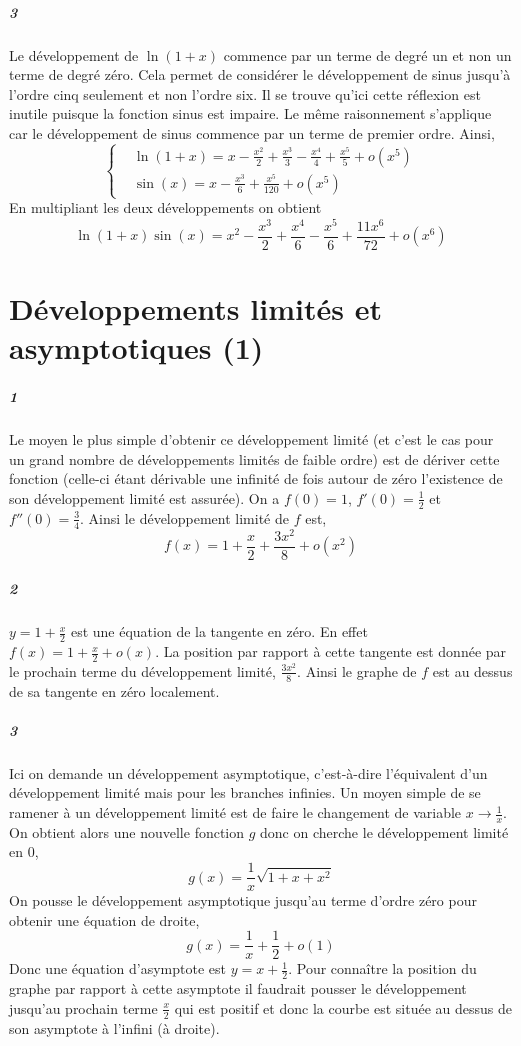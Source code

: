 \documentclass[10pt,a4paper]{article}
\newcommand{\al}[1]{\begin{aligned} #1 \end{aligned}}
\begin{document}
\subparagraph{3}
Le développement de $\ln(1+x)$ commence par un terme de degré un et non un terme de degré zéro. Cela permet de considérer le développement de sinus jusqu'à l'ordre cinq seulement et non l'ordre six. Il se trouve qu'ici cette réflexion est inutile puisque la fonction sinus est impaire. Le même raisonnement s'applique car le développement de sinus commence par un terme de premier ordre.
Ainsi,
\[
\left\lbrace
\al{
&\ln(1+x) = x - \frac{x^2}{2} + \frac{x^3}{3} - \frac{x^4}{4} + \frac{x^5}{5} + o(x^5) \\
&\sin(x) = x - \frac{x^3}{6} + \frac{x^5}{120} + o(x^5)
}
\right.
\]
En multipliant les deux développements on obtient
\[
\ln(1+x)\sin(x) = x^2 - \frac{x^3}{2} + \frac{x^4}{6} - \frac{x^5}{6} + \frac{11x^6}{72} + o(x^6)
\]
\section{Développements limités et asymptotiques (1)}

\subparagraph{1}Le moyen le plus simple d'obtenir ce développement limité (et c'est le cas pour un grand nombre de développements limités de faible ordre) est de dériver cette fonction (celle-ci étant dérivable une infinité de fois autour de zéro l'existence de son développement limité est assurée). On a $f(0) = 1$, $f'(0) = \frac{1}{2}$ et $f''(0) = \frac{3}{4}$. Ainsi le développement limité de $f$ est,
\[
f(x) = 1 + \frac{x}{2} + \frac{3x^2}{8} + o(x^2)
\]

\subparagraph{2} $y= 1 + \frac{x}{2}$ est une équation de la tangente en zéro. En effet $f(x) = 1+\frac{x}{2} + o(x)$. La position par rapport à cette tangente est donnée par le prochain terme du développement limité, $\frac{3x^2}{8}$. Ainsi le graphe de $f$ est au dessus de sa tangente en zéro localement.

\subparagraph{3}Ici on demande un développement asymptotique, c'est-à-dire l'équivalent d'un développement limité mais pour les branches infinies. Un moyen simple de se ramener à un développement limité est de faire le changement de variable $x \rightarrow \frac{1}{x}$. On obtient alors une nouvelle fonction $g$ donc on cherche le développement limité en $0$,
\[
g(x) = \frac{1}{x}\sqrt{1 + x + x^2 }
\]
On pousse le développement asymptotique jusqu'au terme d'ordre zéro pour obtenir une équation de droite,
\[
g(x) = \frac{1}{x} + \frac{1}{2} + o(1)
\]
Donc une équation d'asymptote est $y = x + \frac{1}{2}$. Pour connaître la position du graphe par rapport à cette asymptote il faudrait pousser le développement jusqu'au prochain terme $\frac{x}{2}$ qui est positif et donc la courbe est située au dessus de son asymptote à l'infini (à droite).
\end{document}
